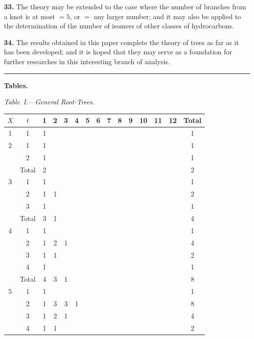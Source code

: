 \documentclass[11pt,a4paper]{article}
\begin{document}
{\medskip
\noindent\textbf{33.}
The theory may be extended to the case where the number of branches from a knot is at most $=5$, or $=$ any larger number; and it may also be applied to the determination of the number of isomers of other classes of hydrocarbons.

\medskip
\noindent\textbf{34.}
The results obtained in this paper complete the theory of trees as far as it has been developed; and it is hoped that they may serve as a foundation for further researches in this interesting branch of analysis.

\bigskip
\begin{center}
\rule{0.5\textwidth}{0.4pt}
\end{center}

\medskip
\noindent\textbf{Tables.}

\medskip
\noindent\textit{Table~I.---General Root-Trees.}
\begin{center}
\small
\begin{longtable}{|c|c|c|c|c|c|c|c|c|c|c|c|c|c|c|}
\hline
$X$ & $t$ & 1 & 2 & 3 & 4 & 5 & 6 & 7 & 8 & 9 & 10 & 11 & 12 & Total \\
\hline
\endfirsthead
1 & 1 & 1 & & & & & & & & & & & & 1 \\
\hline
2 & 1 & 1 & & & & & & & & & & & & 1 \\
  & 2 & 1 & & & & & & & & & & & & 1 \\
  & Total & 2 & & & & & & & & & & & & 2 \\
\hline
3 & 1 & 1 & & & & & & & & & & & & 1 \\
  & 2 & 1 & 1 & & & & & & & & & & & 2 \\
  & 3 & 1 & & & & & & & & & & & & 1 \\
  & Total & 3 & 1 & & & & & & & & & & & 4 \\
\hline
4 & 1 & 1 & & & & & & & & & & & & 1 \\
  & 2 & 1 & 2 & 1 & & & & & & & & & & 4 \\
  & 3 & 1 & 1 & & & & & & & & & & & 2 \\
  & 4 & 1 & & & & & & & & & & & & 1 \\
  & Total & 4 & 3 & 1 & & & & & & & & & & 8 \\
\hline
5 & 1 & 1 & & & & & & & & & & & & 1 \\
  & 2 & 1 & 3 & 3 & 1 & & & & & & & & & 8 \\
  & 3 & 1 & 2 & 1 & & & & & & & & & & 4 \\
  & 4 & 1 & 1 & & & & & & & & & & & 2 \\

\end{longtable}
\end{center}}
\end{document}
